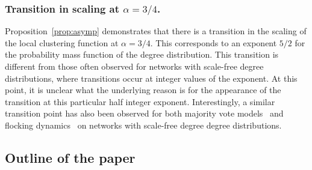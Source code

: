 \subsubsection{Transition in scaling at \texorpdfstring{$\alpha = 3/4$}{alpha equals 3/4}.}


Proposition~\ref{prop:asymp} demonstrates that there is a transition in the scaling of the local clustering 
function at $\alpha = 3/4$. 
This corresponds to an exponent $5/2$ for the probability mass function of the degree distribution. 
This transition is different from those often observed for networks with scale-free degree distributions, where transitions occur at
integer values of the exponent. 
At this point, it is unclear what the underlying reason is for the appearance of the transition at this particular half integer 
exponent. 
Interestingly, a similar transition point has also been observed for both majority vote models~\cite{chen2015critical} and 
flocking dynamics~\cite{miguel2018effects} on networks with scale-free degree degree distributions.






\subsection{Outline of the paper}



